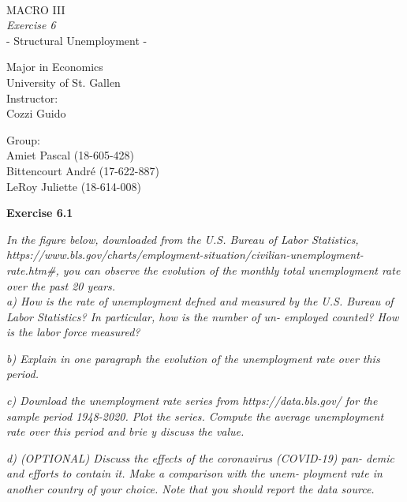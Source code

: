 \documentclass[11pt]{article} %
\begin{document}
\thispagestyle{empty}
\ \vspace{1.0cm}
\begin{center}
{\LARGE
MACRO III \\
\textit{Exercise 6} \\
{\small - Structural Unemployment -}\\[2cm]
}

{
Major in Economics \\
{University of St. Gallen} \\ [2cm]
Instructor:\\
Cozzi Guido \\[2cm]
}

{
Group:\\
Amiet Pascal (18-605-428)\\
Bittencourt André (17-622-887)\\
LeRoy Juliette (18-614-008)\\
}
\end{center}

\pagebreak

\textbf{\Large{Exercise 6.1}}

\textit{In the figure below, downloaded from the U.S. Bureau of Labor Statistics,
https://www.bls.gov/charts/employment-situation/civilian-unemployment-rate.htm#,
you can observe the evolution of the monthly total unemployment rate over
the past 20 years.}\\

\textit{a) How is the rate of unemployment defned and measured by the U.S.
Bureau of Labor Statistics? In particular, how is the number of un-
employed counted? How is the labor force measured?}




\pagebreak
\textit{b) Explain in one paragraph the evolution of the unemployment rate over
this period.}\par 





\pagebreak
\textit{c) Download the unemployment rate series from https://data.bls.gov/ for
the sample period 1948-2020. Plot the series. Compute the average
unemployment rate over this period and brie
y discuss the value.}\par 




\pagebreak
\textit{d) (OPTIONAL) Discuss the effects of the coronavirus (COVID-19) pan-
demic and efforts to contain it. Make a comparison with the unem-
ployment rate in another country of your choice. Note that you should
report the data source.}\par
\end{document}
